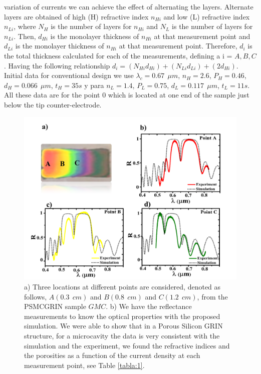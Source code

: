 \documentclass{article}
\begin{document}
variation of currents we can achieve the effect of alternating the
layers. Alternate layers are obtained of high (H) refractive index
$n_{Hi}$ and low (L) refractive index $n_{Li}$, where $N_{H}$
is the number of layers for  $n_{Hi}$ and $N_L$ is the number
of layers for $n_{Li}$. Then,  $d_{Hi}$ is the monolayer
thickness of  $n_{Hi}$ at that measurement point and $d_{Li}$ is
the monolayer thickness of $n_{Hi}$ at that measurement
point. Therefore,  $d_i$ is the total thickness calculated for
each of the measurements, defining a i = $ A, B, C$. Having the
following relationship $d_i =
(N_{Hi}d_{Hi})+(N_{Li}d_{Li}) + (2d_{Hi})$.
Initial data for conventional design we use  $\lambda_c= 0.67 \ \
\mu m$, $n_H =2.6$, $P_H =0.46$, $d_H=0.066 \ \ \mu m
$, $t_H=35 s  $ y para  $n_L= 1.4$,  $P_L =0.75$,
$d_L=0.117 \ \ \mu m  $, $t_L=11 s  $. All these data are
for the point $ 0 $ which is located at one end of the sample just
below the tip counter-electrode.
\begin{figure}
  \centering
  \includegraphics[width=\textwidth]{Images/MCGRIN2}
  \caption{a) Three locations at different points are
      considered, denoted as follows, $ A (0.3 \ \ cm) $ and $ B
      (0.8 \ \ cm) $ and $ C (1.2 \ \ cm) $, from the PSMCGRIN
      sample $ GMC $. b) We have the reflectance measurements to
      know the optical properties with the proposed
      simulation. We were able to show that in a Porous Silicon
      GRIN structure, for a microcavity the data is very
      consistent with the simulation and the experiment, we
      found the refractive indices and the porosities as a
      function of the current density at each measurement point,
      see Table \ref{tabla:1}. }
  \label{fig:MCGRIN3}
\end{figure}
\end{document}
